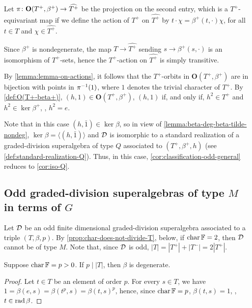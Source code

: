 Let $\pi\colon \mathbf {O} (T^+, \beta^+) \to \widehat{T^+}$ be the projection on the second entry, which is a $T^+$-equivariant map if we define the action of $T^+$ on $\widehat{T^+}$ by $t\cdot \chi = \beta^+(t,\cdot) \chi$, for all $t\in T$ and $\chi \in \widehat{T^+}$. 

Since $\beta^+$ is nondegenerate, the map $T \to \widehat{T^+}$ sending $s \to \beta^+(s, \cdot)$ is an isomorphism of $T^+$-sets, hence the $T^+$-action on $\widehat{T^+}$ is simply transitive. 

By \cref{lemma:lemma-on-actions}, it follows that the $T^+$-orbits in $\mathbf {O} (T^+, \beta^+)$ are in bijection with points in $\pi^{-1} (1)$, where $1$ denotes the trivial character of $T^+$. 
By \cref{def:O(T+-beta+)}, $(h, 1) \in \mathbf {O} (T^+, \beta^+)$, $(h, 1)$ if, and only if, $h^2 \in T^+$ and $h^2 \in \ker \beta^+$, \ie, $h^2 = e$. 

Note that in this case $(h, \bar 1) \in \ker \beta$, so in view of \cref{lemma:beta-deg-beta-tilde-nondeg}, $\ker \beta = \langle (h, \bar 1) \rangle$ and $\mathcal{D}$ is isomorphic to a standard realization of a graded-division superalgebra of type $Q$ associated to $(T^+, \beta^+, h)$ (see \cref{def:standard-realization-Q}). 
Thus, in this case, \cref{cor:classification-odd-general} reduces to \cref{cor:iso-Q}.

\subsection{Odd graded-division superalgebras of type \texorpdfstring{$M$}{M} in terms of \texorpdfstring{$G$}{M}}

Let $\mathcal{D}$ be an odd finite dimensional graded-division superalgebra associated to a triple $(T, \beta, p)$. 
By \cref{prop:char-does-not-divide-T}, below, if $\operatorname{char} \mathbb{F} = 2$, then $\mathcal{D}$ cannot be of type $M$. 
Note that, since $\mathcal{D}$ is odd, $|T| = |T^+| + |T^-| = 2|T^+|$.

\begin{prop}\label{prop:char-does-not-divide-T}
    Suppose $\operatorname{char} \mathbb{F} = p > 0$. 
    If $p \mid |T|$, then $\beta$ is degenerate.
\end{prop}

\begin{proof}
    Let $t\in T$ be an element of order $p$. 
    For every $s\in T$, we have $1 = \beta(e, s) = \beta(t^p, s) = \beta(t, s)^p$, hence, since $\operatorname{char} \mathbb{F} = p$, $\beta(t, s) = 1$, \ie, $t\in \operatorname{rad} \beta$. 
\end{proof}
 
